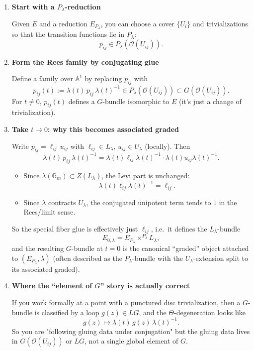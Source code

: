 \documentclass[12pt]{article}
\begin{document}
\begin{enumerate}
    \item \textbf{Start with a $P_\lambda$-reduction}
    
    Given $E$ and a reduction $E_{P_\lambda}$, you can choose a cover $\{U_i\}$ and trivializations so that the transition functions lie in $P_\lambda$:
    \[
    p_{ij} \in P_\lambda(\mathcal{O}(U_{ij})).
    \]

    \item \textbf{Form the Rees family by conjugating glue}
    
    Define a family over $\mathbb{A}^1$ by replacing $p_{ij}$ with
    \[
    p_{ij}(t) := \lambda(t) \, p_{ij} \, \lambda(t)^{-1} \in P_\lambda(\mathcal{O}(U_{ij})) \subset G(\mathcal{O}(U_{ij})).
    \]
    For $t \neq 0$, $p_{ij}(t)$ defines a $G$-bundle isomorphic to $E$ (it's just a change of trivialization).

    \item \textbf{Take $t \to 0$: why this becomes associated graded}
    
    Write $p_{ij} = \ell_{ij} \, u_{ij}$ with $\ell_{ij} \in L_\lambda$, $u_{ij} \in U_\lambda$ (locally). Then
    \[
    \lambda(t) \, p_{ij} \, \lambda(t)^{-1} = \lambda(t) \ell_{ij} \lambda(t)^{-1} \cdot \lambda(t) u_{ij} \lambda(t)^{-1}.
    \]
    \begin{itemize}
        \item Since $\lambda(\mathbb{G}_m) \subset Z(L_\lambda)$, the Levi part is unchanged:
        \[
        \lambda(t) \ell_{ij} \lambda(t)^{-1} = \ell_{ij}.
        \]
        \item Since $\lambda$ contracts $U_\lambda$, the conjugated unipotent term tends to $1$ in the Rees/limit sense.
    \end{itemize}
    
    So the special fiber glue is effectively just $\ell_{ij}$, i.e.\ it defines the $L_\lambda$-bundle
    \[
    E_{0,\lambda} = E_{P_\lambda} \times^{P_\lambda} L_\lambda,
    \]
    and the resulting $G$-bundle at $t=0$ is the canonical ``graded'' object attached to $(E_{P_\lambda}, \lambda)$ (often described as the $P_\lambda$-bundle with the $U_\lambda$-extension split to its associated graded).

    \item \textbf{Where the ``element of $G$'' story is actually correct}
    
    If you work formally at a point with a punctured disc trivialization, then a $G$-bundle is classified by a loop $g(z) \in LG$, and the $\Theta$-degeneration looks like
    \[
    g(z) \mapsto \lambda(t) \, g(z) \, \lambda(t)^{-1}.
    \]
    So you are "following gluing data under conjugation" but the gluing data lives in $G(\mathcal{O}(U_{ij}))$ or $LG$, not a single global element of $G$.
\end{enumerate}
\end{document}

